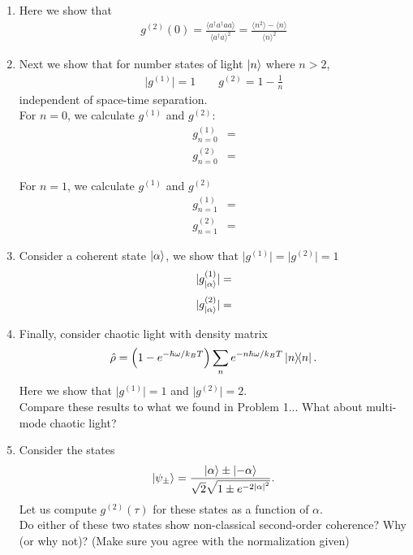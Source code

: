 \documentclass{article}
\theoremstyle{definition}
\newcommand{\al}{\alpha}
\newcommand{\f}[2]{\frac{#1}{#2}}
\newcommand{\lp}{\left(}
\newcommand{\rp}{\right)}
\begin{document}
\begin{enumerate}[label=\alph*)]

\item Here we show that 
\begin{align*}
g^{(2)}(0) = \f{\langle a^\dagger a^\dagger a a  \rangle}{\langle a^\dagger a  \rangle^2}   = \f{\langle n^2 \rangle - \langle n  \rangle}{\langle n \rangle^2}
\end{align*}

\item Next we show that for number states of light $\ket{n}$ where $n > 2$, 
\begin{align*}
\vert g^{(1)} \vert = 1 \quad\quad g^{(2)} = 1 - \f{1}{n}
\end{align*}
independent of space-time separation. \\

\noindent For $n=0$, we calculate $g^{(1)}$ and $g^{(2)}$:
\begin{align*}
g_{n=0}^{(1)} &= \\
g_{n=0}^{(2)} &= 
\end{align*}

\noindent For $n=1$, we calculate $g^{(1)}$ and $g^{(2)}$
\begin{align*}
g_{n=1}^{(1)} &= \\
g_{n=1}^{(2)} &= 
\end{align*}

\item Consider a coherent state $\ket{\al}$, we show that $\vert g^{(1)} \vert = \vert g^{(2)} \vert = 1$
\begin{align*}
\vert g^{(1)}_{\ket{\al}} \vert =  
\end{align*}
\begin{align*}
\vert g^{(2)}_{\ket{\al}} \vert =  
\end{align*} 

\item Finally, consider chaotic light with density matrix
\begin{align*}
\hat{\rho} = \lp  1 - e^{-\hbar \omega / k_B T} \rp \sum_n e^{-n\hbar \omega / k_B T} \ketbra{n}.
\end{align*}
Here we show that $\vert g^{(1)} \vert = 1$ and $\vert g^{(2)} \vert = 2$.\\


Compare these results to what we found in Problem 1... What about multi-mode chaotic light?

\item Consider the states
\begin{align*}
\ket{\psi_\pm} = \f{\ket{\al} \pm  \ket{-\al}}{ \sqrt{2}  \sqrt{1 \pm e^{-2\abs{\al}^2}}}.
\end{align*}
Let us compute $g^{(2)}(\tau)$ for these states as a function of $\al$. \\


Do either of these two states show non-classical second-order coherence? Why (or why not)?
(Make sure you agree with the normalization given)

\end{enumerate}
\end{document}
